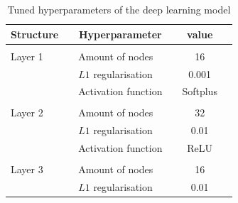 \documentclass[11pt]{article}
\begin{document}
\vspace{1cm}
\begin{table}[h]
\begin{center}
\caption{Tuned hyperparameters of the deep learning model}
\label{tab:hyperparameters}
\begin{tabular}{llllcl}
\toprule
\multicolumn{1}{c}{\textbf{Structure}} & \multicolumn{1}{c}{} & \multicolumn{1}{c}{\textbf{Hyperparameter}} & \multicolumn{1}{c}{} & value                & \multicolumn{1}{c}{} \\ \midrule
                              &                      &                                    &                      & \multicolumn{1}{l}{} &                      \\
Layer 1                       &                      & Amount of nodes                    &                      & 16                   &                      \\
                              &                      & $L1$ regularisation                &                      & 0.001                &                      \\
                              &                      & Activation function                &                      & Softplus             &                      \\
                              &                      &                                    &                      &                      &                      \\
Layer 2                       &                      & Amount of nodes                    &                      & 32                   &                      \\
                              &                      & $L1$ regularisation                &                      & 0.01                 &                      \\
                              &                      & Activation function                &                      & ReLU                 &                      \\
                              &                      &                                    &                      &                      &                      \\
Layer 3                       &                      & Amount of nodes                    &                      & 16                   &                      \\
                              &                      & $L1$ regularisation                &                      & 0.01                 &                      \\

\end{tabular}
\end{center}
\end{table}
\end{document}

